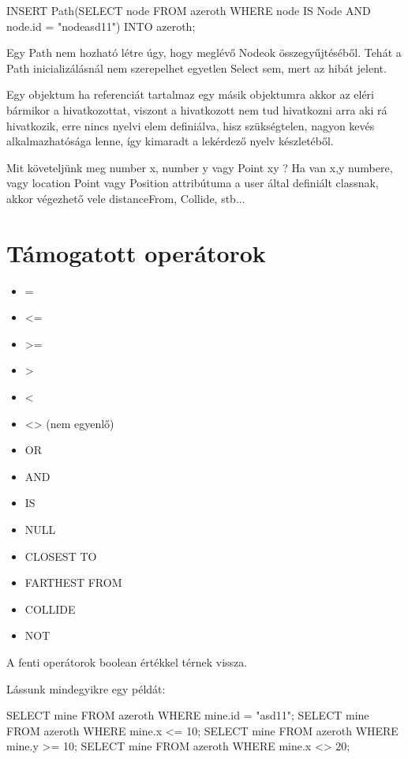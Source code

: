 \begin{itemize}
\begin{sql}
INSERT Path(SELECT node FROM azeroth WHERE node IS Node AND node.id = "nodeasd11") INTO azeroth;
\end{sql}

Egy Path nem hozható létre úgy, hogy  meglévő Nodeok összegyűjtéséből. Tehát a Path inicializálásnál nem szerepelhet egyetlen Select sem, mert az hibát jelent.

Egy objektum ha referenciát tartalmaz egy másik objektumra akkor az eléri bármikor a hivatkozottat, viszont a hivatkozott nem tud hivatkozni arra aki rá hivatkozik, erre nincs nyelvi elem definiálva, hisz szükségtelen, nagyon kevés alkalmazhatósága lenne, így kimaradt a lekérdező nyelv készletéből.

Mit követeljünk meg number x, number y vagy Point xy ?
Ha van x,y numbere, vagy location Point vagy Position attribútuma a user által definiált classnak, akkor végezhető vele distanceFrom, Collide, stb...

\end{itemize}

\section{Támogatott operátorok}
\begin{itemize}
\item = 
\item <= 
\item >= 
\item > 
\item < 
\item <> (nem egyenlő) 
\item OR 
\item AND 
\item IS 
\item NULL
\item CLOSEST TO
\item FARTHEST FROM
\item COLLIDE
\item NOT
\end{itemize}

A fenti operátorok boolean értékkel térnek vissza.

Lássunk mindegyikre egy példát:
\begin{sql}
SELECT mine FROM azeroth WHERE mine.id = "asd11";
SELECT mine FROM azeroth WHERE mine.x <= 10;
SELECT mine FROM azeroth WHERE mine.y >= 10;
SELECT mine FROM azeroth WHERE mine.x <> 20;
\end{sql}

